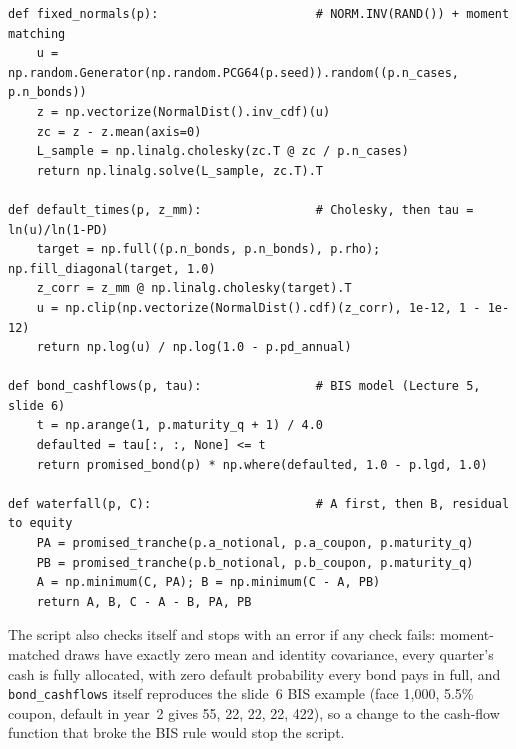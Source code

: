 \documentclass[11pt]{article}
\begin{document}
\begin{lstlisting}
def fixed_normals(p):                      # NORM.INV(RAND()) + moment matching
    u = np.random.Generator(np.random.PCG64(p.seed)).random((p.n_cases, p.n_bonds))
    z = np.vectorize(NormalDist().inv_cdf)(u)
    zc = z - z.mean(axis=0)
    L_sample = np.linalg.cholesky(zc.T @ zc / p.n_cases)
    return np.linalg.solve(L_sample, zc.T).T

def default_times(p, z_mm):                # Cholesky, then tau = ln(u)/ln(1-PD)
    target = np.full((p.n_bonds, p.n_bonds), p.rho); np.fill_diagonal(target, 1.0)
    z_corr = z_mm @ np.linalg.cholesky(target).T
    u = np.clip(np.vectorize(NormalDist().cdf)(z_corr), 1e-12, 1 - 1e-12)
    return np.log(u) / np.log(1.0 - p.pd_annual)

def bond_cashflows(p, tau):                # BIS model (Lecture 5, slide 6)
    t = np.arange(1, p.maturity_q + 1) / 4.0
    defaulted = tau[:, :, None] <= t
    return promised_bond(p) * np.where(defaulted, 1.0 - p.lgd, 1.0)

def waterfall(p, C):                       # A first, then B, residual to equity
    PA = promised_tranche(p.a_notional, p.a_coupon, p.maturity_q)
    PB = promised_tranche(p.b_notional, p.b_coupon, p.maturity_q)
    A = np.minimum(C, PA); B = np.minimum(C - A, PB)
    return A, B, C - A - B, PA, PB
\end{lstlisting}

\noindent The script also checks itself and stops with an error if any check fails: moment-matched draws have exactly zero mean and
identity covariance, every quarter's cash is fully allocated, with zero default probability every bond pays in full, and \texttt{bond\_cashflows} itself reproduces the
slide~6 BIS example (face 1{,}000, 5.5\% coupon, default in year~2 gives 55, 22, 22, 22, 422), so a change to the cash-flow function
that broke the BIS rule would stop the script.
\end{document}
